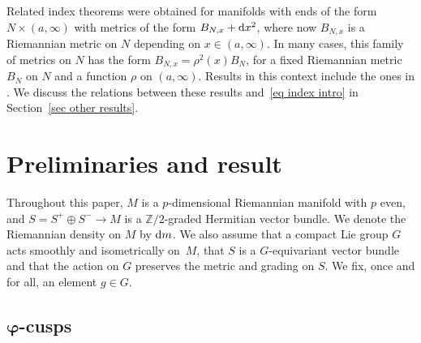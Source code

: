 \documentclass[pdftex]{sigma}%
\numberwithin{equation}{section}
\newcommand{\Z}{\mathbb{Z}}
\begin{document}
Related index theorems were obtained for manifolds with ends of the form $N \times (a, \infty)$ with metrics of the form $B_{N, x} + {\rm d}x^2$, where now $B_{N, x}$ is a Riemannian metric on $N$ depending on $x\in (a, \infty)$. In many cases, this family of metrics on $N$ has the form $B_{N, x} = \rho^2(x)B_N$, for a fixed Riemannian metric $B_N$ on $N$ and a function $\rho$ on $(a, \infty)$. Results in this context include the ones in
 \cite{Baier02, BB03, BBC12, Stern84, Vaillant01}. We discuss the relations between these results and~\eqref{eq index intro} in Section~\ref{sec other results}.



\section{Preliminaries and result} \label{sec results}

Throughout this paper, $M$ is a $p$-dimensional Riemannian manifold with $p$ even, and $S = S^+ \oplus S^-\to M$ is a $\Z/2$-graded Hermitian vector bundle.
We denote the Riemannian density on $M$ by ${\rm d}m$. We also assume that a compact Lie group $G$ acts smoothly and isometrically on~$M$, that $S$ is a $G$-equivariant vector bundle and that the action on $G$ preserves the metric and grading on $S$. We fix, once and for all, an element $g \in G$.

\subsection[varphi-cusps]{$\boldsymbol{\varphi}$-cusps}
\end{document}
